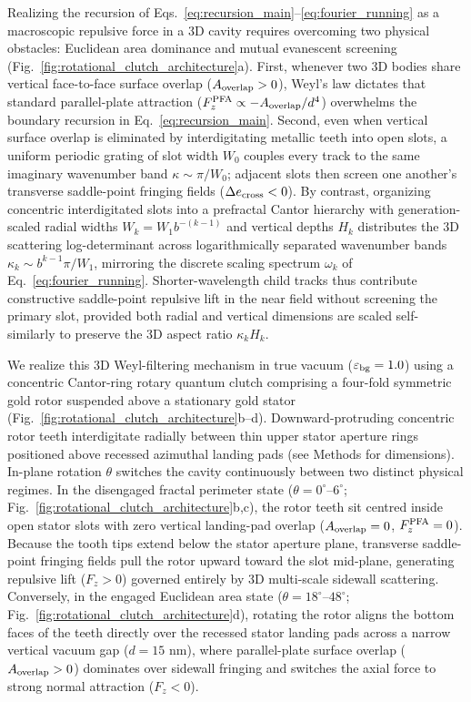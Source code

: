 \documentclass[pdflatex,sn-nature]{sn-jnl}
\begin{document}
Realizing the recursion of Eqs.~\eqref{eq:recursion_main}--\eqref{eq:fourier_running} as a macroscopic repulsive force in a 3D cavity requires overcoming two physical obstacles: Euclidean area dominance and mutual evanescent screening (Fig.~\ref{fig:rotational_clutch_architecture}a). First, whenever two 3D bodies share vertical face-to-face surface overlap ($A_{\rm overlap} > 0$), Weyl's law dictates that standard parallel-plate attraction ($F_z^{\rm PFA} \propto -A_{\rm overlap}/d^4$) overwhelms the boundary recursion in Eq.~\eqref{eq:recursion_main}\cite{lapidus1991}. Second, even when vertical surface overlap is eliminated by interdigitating metallic teeth into open slots\cite{levin2010}, a uniform periodic grating of slot width $W_0$ couples every track to the same imaginary wavenumber band $\kappa \sim \pi/W_0$; adjacent slots then screen one another's transverse saddle-point fringing fields ($\Delta e_{\rm cross} < 0$). By contrast, organizing concentric interdigitated slots into a prefractal Cantor hierarchy with generation-scaled radial widths $W_k = W_1 b^{-(k-1)}$ and vertical depths $H_k$ distributes the 3D scattering log-determinant across logarithmically separated wavenumber bands $\kappa_k \sim b^{k-1}\pi/W_1$, mirroring the discrete scaling spectrum $\omega_k$ of Eq.~\eqref{eq:fourier_running}. Shorter-wavelength child tracks thus contribute constructive saddle-point repulsive lift in the near field without screening the primary slot, provided both radial and vertical dimensions are scaled self-similarly to preserve the 3D aspect ratio $\kappa_k H_k$.

We realize this 3D Weyl-filtering mechanism in true vacuum ($\varepsilon_{\rm bg}=1.0$) using a concentric Cantor-ring rotary quantum clutch comprising a four-fold symmetric gold rotor suspended above a stationary gold stator (Fig.~\ref{fig:rotational_clutch_architecture}b--d). Downward-protruding concentric rotor teeth interdigitate radially between thin upper stator aperture rings positioned above recessed azimuthal landing pads (see Methods for dimensions). In-plane rotation $\theta$ switches the cavity continuously between two distinct physical regimes. In the disengaged fractal perimeter state ($\theta = 0^\circ\text{--}6^\circ$; Fig.~\ref{fig:rotational_clutch_architecture}b,c), the rotor teeth sit centred inside open stator slots with zero vertical landing-pad overlap ($A_{\rm overlap} = 0$, $F_z^{\rm PFA} = 0$). Because the tooth tips extend below the stator aperture plane, transverse saddle-point fringing fields pull the rotor upward toward the slot mid-plane, generating repulsive lift ($F_z > 0$) governed entirely by 3D multi-scale sidewall scattering. Conversely, in the engaged Euclidean area state ($\theta = 18^\circ\text{--}48^\circ$; Fig.~\ref{fig:rotational_clutch_architecture}d), rotating the rotor aligns the bottom faces of the teeth directly over the recessed stator landing pads across a narrow vertical vacuum gap ($d = 15\text{ nm}$), where parallel-plate surface overlap ($A_{\rm overlap} > 0$) dominates over sidewall fringing and switches the axial force to strong normal attraction ($F_z < 0$).
\end{document}
